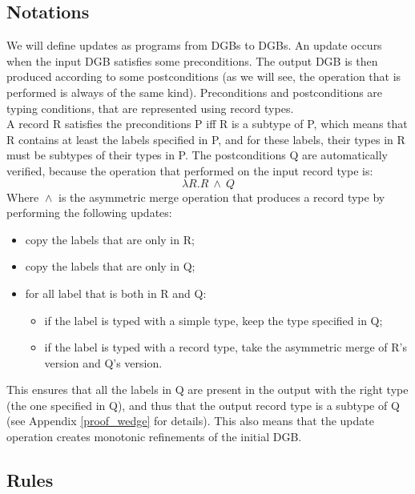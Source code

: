 \documentclass[11pt]{article}
\begin{document}
		\subsection{Notations}
			We will define updates as programs from DGBs to DGBs. An update occurs when the input DGB satisfies some preconditions. The output DGB is then produced according to some postconditions (as we will see, the operation that is performed is always of the same kind). Preconditions and postconditions are typing conditions, that are represented using record types.\\
			
			A record R satisfies the preconditions P iff R is a subtype of P, which means that R contains at least the labels specified in P, and for these labels, their types in R must be subtypes of their types in P. The postconditions Q are automatically verified, because the operation that performed on the input record type is:
			\begin{equation*}
				\lambda R. R \ \boxed{\wedge} \ Q
			\end{equation*}
			Where $\boxed{\wedge}$ is the asymmetric merge operation that produces a record type by performing the following updates:
			\begin{itemize}
				\item copy the labels that are only in R;\vspace{-2mm}
				\item copy the labels that are only in Q; \vspace{-2mm}
				\item for all label that is both in R and Q: \vspace{-2mm}
				\begin{itemize}
					\item if the label is typed with a simple type, keep the type specified in Q;\vspace{-1mm}
					\item if the label is typed with a record type, take the asymmetric merge of R's version and Q's version.
				\end{itemize}
			\end{itemize}
			This ensures that all the labels in Q are present in the output with the right type (the one specified in Q), and thus that the output record type is a subtype of Q (see Appendix \ref{proof_wedge} for details). This also means that the update operation creates monotonic refinements of the initial DGB.
		\subsection{Rules}
\end{document}

